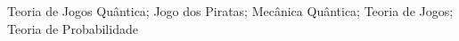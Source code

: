 \begin{palavraschave}
Teoria de Jogos Qu\^antica; Jogo dos Piratas; Mec\^anica Qu\^antica; Teoria de Jogos; Teoria de Probabilidade
\end{palavraschave}
\clearpage
\thispagestyle{empty}
\cleardoublepage